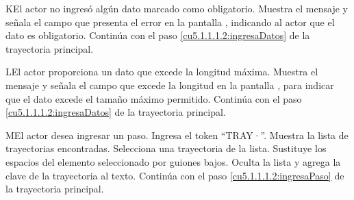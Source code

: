  \begin{UCtrayectoriaA}{K}{El actor no ingresó algún dato marcado como obligatorio.}
    \UCpaso[\UCsist] Muestra el mensaje  y señala el campo que presenta el error en la pantalla 
	    , indicando al actor que el dato es obligatorio.
    \UCpaso[] Continúa con el paso \ref{cu5.1.1.1.2:ingresaDatos} de la trayectoria principal.
 \end{UCtrayectoriaA}
 
 \begin{UCtrayectoriaA}{L}{El actor proporciona un dato que excede la longitud máxima.}
    \UCpaso[\UCsist] Muestra el mensaje  y señala el campo que excede la 
    longitud en la pantalla , para indicar que el dato excede el tamaño máximo permitido.
    \UCpaso[] Continúa con el paso \ref{cu5.1.1.1.2:ingresaDatos} de la trayectoria principal.
 \end{UCtrayectoriaA}

 \begin{UCtrayectoriaA}{M}{El actor desea ingresar un paso.}
 	\UCpaso[\UCactor] Ingresa el token ``TRAY·''.
  	\UCpaso[\UCsist] Muestra la lista de trayectorias encontradas.
 	\UCpaso[\UCactor] Selecciona una trayectoria de la lista.
  	\UCpaso[\UCsist] Sustituye los espacios del elemento seleccionado por guiones bajos.
  	\UCpaso[\UCsist] Oculta la lista y agrega la clave de la trayectoria al texto.
    \UCpaso[] Continúa con el paso \ref{cu5.1.1.1.2:ingresaPaso} de la trayectoria principal.
 \end{UCtrayectoriaA}